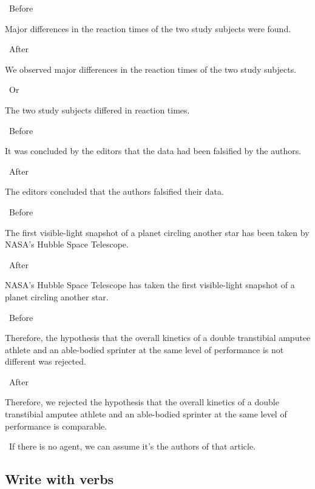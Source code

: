 \documentclass[a4paper, 12pt]{article}
\begin{document}
\par\textbullet\ Before
\par Major differences in the reaction times of the two study subjects were found.

\par\textbullet\ After
\par We observed major differences in the reaction times of the two study subjects.

\par\textbullet\ Or
\par The two study subjects differed in reaction times.

\par\textbullet\ Before
\par It was concluded by the editors that the data had been falsified by the authors.

\newpage\par\textbullet\ After
\par The editors concluded that the authors falsified their data.

\par\textbullet\ Before
\par The first visible-light snapshot of a planet circling another star has been taken by NASA’s Hubble Space Telescope.

\par\textbullet\ After
\par NASA's Hubble Space Telescope has taken the first visible-light snapshot of a planet circling another star.

\par\textbullet\ Before
\par Therefore, the hypothesis that the overall kinetics of a double transtibial amputee athlete and an able-bodied sprinter at the same level of performance is not different was rejected.

\par\textbullet\ After
\par Therefore, we rejected the hypothesis that the overall kinetics of a double transtibial amputee athlete and an able-bodied sprinter at the same level of performance is comparable.

\par\textbullet\ If there is no agent, we can assume it's the authors of that article.

\newpage\subsection{Write with verbs}
\end{document}
